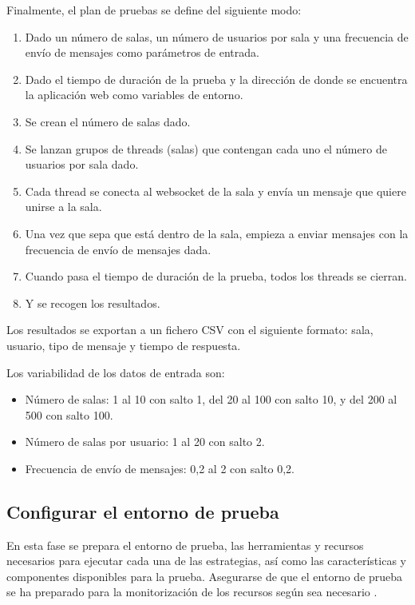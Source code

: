 Finalmente, el plan de pruebas se define del siguiente modo:

\begin{enumerate}
  \item Dado un número de salas, un número de usuarios por sala y una frecuencia de envío de mensajes como parámetros de entrada.
  \item Dado el tiempo de duración de la prueba y la dirección de donde se encuentra la aplicación web como variables de entorno.
  \item Se crean el número de salas dado.
  \item Se lanzan grupos de threads (salas) que contengan cada uno el número de usuarios por sala dado.
  \item Cada thread se conecta al websocket de la sala y envía un mensaje que quiere unirse a la sala.
  \item Una vez que sepa que está dentro de la sala, empieza a enviar mensajes con la frecuencia de envío de mensajes dada.
  \item Cuando pasa el tiempo de duración de la prueba, todos los threads se cierran.
  \item Y se recogen los resultados.
\end{enumerate}

Los resultados se exportan a un fichero CSV con el siguiente formato: sala, usuario, tipo de mensaje y tiempo de respuesta.

Los variabilidad de los datos de entrada son:

\begin{itemize}
  \item Número de salas: 1 al 10 con salto 1, del 20 al 100 con salto 10, y del 200 al 500 con salto 100.
  \item Número de salas por usuario: 1 al 20 con salto 2.
  \item Frecuencia de envío de mensajes: 0,2 al 2 con salto 0,2.
\end{itemize}

\subsection{Configurar el entorno de prueba}

En esta fase se prepara el entorno de prueba, las herramientas y recursos necesarios para ejecutar cada una de las estrategias, así como las características y componentes disponibles para la prueba. Asegurarse de que el entorno de prueba se ha preparado para la monitorización de los recursos según sea necesario \cite{jmeter6}.

